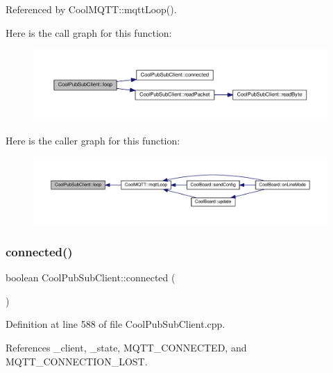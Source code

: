 Referenced by Cool\+M\+Q\+T\+T\+::mqtt\+Loop().

Here is the call graph for this function\+:\nopagebreak
\begin{figure}[H]
\begin{center}
\leavevmode
\includegraphics[width=350pt]{d8/d4b/class_cool_pub_sub_client_afc15900f0fc4886a19394508e61793b8_cgraph}
\end{center}
\end{figure}
Here is the caller graph for this function\+:\nopagebreak
\begin{figure}[H]
\begin{center}
\leavevmode
\includegraphics[width=350pt]{d8/d4b/class_cool_pub_sub_client_afc15900f0fc4886a19394508e61793b8_icgraph}
\end{center}
\end{figure}
\mbox{\label{class_cool_pub_sub_client_a3d5a5da4ddb1e5c1bea64d80c665d148}} 
\subsubsection{\texorpdfstring{connected()}{connected()}}
{\footnotesize\ttfamily boolean Cool\+Pub\+Sub\+Client\+::connected (\begin{DoxyParamCaption}{ }\end{DoxyParamCaption})}



Definition at line 588 of file Cool\+Pub\+Sub\+Client.\+cpp.



References \+\_\+client, \+\_\+state, M\+Q\+T\+T\+\_\+\+C\+O\+N\+N\+E\+C\+T\+ED, and M\+Q\+T\+T\+\_\+\+C\+O\+N\+N\+E\+C\+T\+I\+O\+N\+\_\+\+L\+O\+ST.



